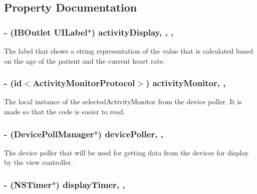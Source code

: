 \subsection{Property Documentation}
\hypertarget{interface_graph_v_c_a75fd5eb6ebad27cbce29475d94459329}{
\subsubsection[{activity\-Display}]{\setlength{\rightskip}{0pt plus 5cm}-\/ (I\-B\-Outlet U\-I\-Label$\ast$) activity\-Display\hspace{0.3cm}{\ttfamily [read]}, {\ttfamily [write]}, {\ttfamily [nonatomic]}, {\ttfamily [retain]}}}\label{interface_graph_v_c_a75fd5eb6ebad27cbce29475d94459329}
The label that shows a string representation of the value that is calculated based on the age of the patient and the current heart rate. \hypertarget{interface_graph_v_c_a0216f83efd648d18c90793fd67206ad8}{
\subsubsection[{activity\-Monitor}]{\setlength{\rightskip}{0pt plus 5cm}-\/ (id$<${\bf Activity\-Monitor\-Protocol}$>$) activity\-Monitor\hspace{0.3cm}{\ttfamily [read]}, {\ttfamily [write]}, {\ttfamily [atomic]}}}\label{interface_graph_v_c_a0216f83efd648d18c90793fd67206ad8}
The local instance of the selected\-Activity\-Monitor from the device poller. It is made so that the code is easier to read. \hypertarget{interface_graph_v_c_a8a00c63cc6cab8b3c1cddaaacc9d12fc}{
\subsubsection[{device\-Poller}]{\setlength{\rightskip}{0pt plus 5cm}-\/ ({\bf Device\-Poll\-Manager}$\ast$) device\-Poller\hspace{0.3cm}{\ttfamily [read]}, {\ttfamily [write]}, {\ttfamily [atomic]}}}\label{interface_graph_v_c_a8a00c63cc6cab8b3c1cddaaacc9d12fc}
The device poller that will be used for getting data from the devices for display by the view controller. \hypertarget{interface_graph_v_c_a5ef6730daa124f69087996078418db0d}{
\subsubsection[{display\-Timer}]{\setlength{\rightskip}{0pt plus 5cm}-\/ (N\-S\-Timer$\ast$) display\-Timer\hspace{0.3cm}{\ttfamily [read]}, {\ttfamily [write]}, {\ttfamily [atomic]}}}\label{interface_graph_v_c_a5ef6730daa124f69087996078418db0d}
